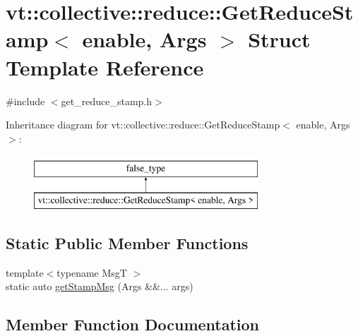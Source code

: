 \hypertarget{structvt_1_1collective_1_1reduce_1_1_get_reduce_stamp}{}\section{vt\+:\+:collective\+:\+:reduce\+:\+:Get\+Reduce\+Stamp$<$ enable, Args $>$ Struct Template Reference}
\label{structvt_1_1collective_1_1reduce_1_1_get_reduce_stamp}


{\ttfamily \#include $<$get\+\_\+reduce\+\_\+stamp.\+h$>$}

Inheritance diagram for vt\+:\+:collective\+:\+:reduce\+:\+:Get\+Reduce\+Stamp$<$ enable, Args $>$\+:\begin{figure}[H]
\begin{center}
\leavevmode
\includegraphics[height=2.000000cm]{structvt_1_1collective_1_1reduce_1_1_get_reduce_stamp}
\end{center}
\end{figure}
\subsection*{Static Public Member Functions}
\begin{DoxyCompactItemize}
\item 
{\footnotesize template$<$typename MsgT $>$ }\\static auto \hyperlink{structvt_1_1collective_1_1reduce_1_1_get_reduce_stamp_a505d946af2e0bde09fcaf865232c52be}{get\+Stamp\+Msg} (Args \&\&... args)
\end{DoxyCompactItemize}


\subsection{Member Function Documentation}
\mbox{\label{structvt_1_1collective_1_1reduce_1_1_get_reduce_stamp_a505d946af2e0bde09fcaf865232c52be}} 
